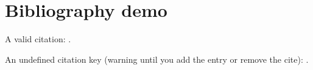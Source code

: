 \section{Bibliography demo}\label{sec:refs}

A valid citation: \cite{lamport1994}.

An undefined citation key (warning until you add the entry or remove the cite):
\cite{unknownAuthor2020}.



